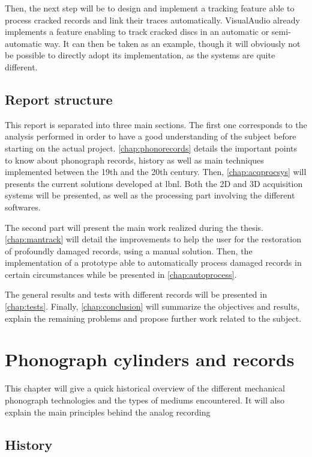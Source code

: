 Then, the next step will be to design and implement a tracking feature able to process cracked records and link their traces automatically. VisualAudio already implements a feature enabling to track cracked discs in an automatic or semi-automatic way. It can then be taken as an example, though it will obviously not be possible to directly adopt its implementation, as the systems are quite different.

\section{Report structure}

This report is separated into three main sections. The first one corresponds to the analysis performed in order to have a good understanding of the subject before starting on the actual project. \autoref{chap:phonorecords} details the important points to know about phonograph records, history as well as main techniques implemented between the 19th and the 20th century. Then, \ref{chap:acqprocsys} will presents the current solutions developed at \gls{lbnl}. Both the 2D and 3D acquisition systems will be presented, as well as the processing part involving the different softwares.

The second part will present the main work realized during the thesis. \autoref{chap:mantrack} will detail the improvements to help the user for the restoration of profoundly damaged records, using a manual solution. Then, the implementation of a prototype able to automatically process damaged records in certain circumstances while be presented in \autoref{chap:autoprocess}.

The general results and tests with different records will be presented in \autoref{chap:tests}. Finally, \autoref{chap:conclusion} will summarize the objectives and results, explain the remaining problems and propose further work related to the subject.

\chapter{Phonograph cylinders and records}
\label{chap:phonorecords}

This chapter will give a quick historical overview of the different mechanical phonograph technologies and the types of mediums encountered. It will also explain the main principles behind the analog recording

\section{History}

